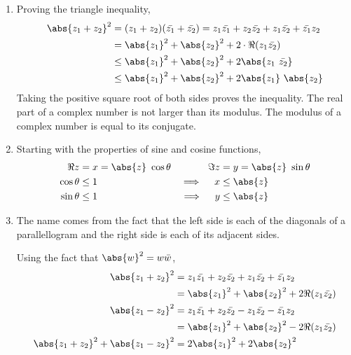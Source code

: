 \begin{enumerate}
    \item Proving the triangle inequality,
          \begin{align}
              \abs{z_1 + z_2}^2 & = (z_1 + z_2)(\bar{z_1} + \bar{z_2})
              = z_1\bar{z_1} + z_2\bar{z_2} + z_1\bar{z_2} + \bar{z_1}z_2 \\
                                & = \abs{z_1}^2 + \abs{z_2}^2 + 2\cdot
              \Re{(z_1\bar{z_2})}                                         \\
                                & \leq \abs{z_1}^2 + \abs{z_2}^2
              + 2 \abs{z_1\ \bar{z_2}}                                    \\
                                & \leq \abs{z_1}^2 + \abs{z_2}^2
              + 2 \abs{z_1}\ \abs{z_2}
          \end{align}
          Taking the positive square root of both sides proves the inequality.
          The real part of a complex number is not larger than its modulus.
          The modulus of a complex number is equal to its conjugate.

    \item Starting with the properties of sine and cosine functions,
          \begin{align}
              \Re{z}           & = x = \abs{z}\ \cos\theta &
              \Im{z}           & = y = \abs{z}\ \sin\theta   \\
              \cos\theta       & \leq 1                    &
              \implies \quad x & \leq \abs{z}                \\
              \sin\theta       & \leq 1                    &
              \implies \quad y & \leq \abs{z}
          \end{align}

    \item The name comes from the fact that the left side is each of the diagonals
          of a parallellogram and the right side is each of its adjacent sides. \par
          Using the fact that $ \abs{w}^2 = w\bar{w} $,
          \begin{align}
              \abs{z_1 + z_2}^2   & = z_1\bar{z_1} + z_2\bar{z_2} + z_1\bar{z_2}
              + \bar{z_1}z_2                                                           \\
                                  & = \abs{z_1}^2 + \abs{z_2}^2 + 2\Re{(z_1\bar{z_2})} \\
              \abs{z_1 - z_2}^2   & = z_1\bar{z_1} + z_2\bar{z_2} - z_1\bar{z_2}
              - \bar{z_1}z_2                                                           \\
                                  & = \abs{z_1}^2 + \abs{z_2}^2 - 2\Re{(z_1\bar{z_2})} \\
              \abs{z_1 + z_2}^2
              + \abs{z_1 - z_2}^2 & = 2\abs{z_1}^2 + 2\abs{z_2}^2
          \end{align}

\end{enumerate}